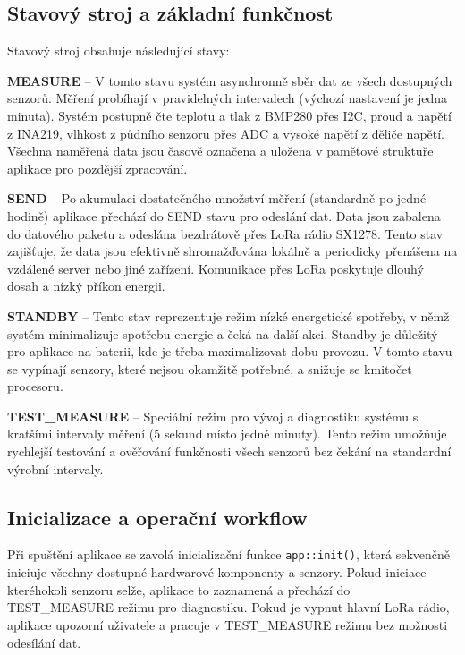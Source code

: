 \documentclass[12pt,a4paper]{article}
\begin{document}
\subsection*{Stavový stroj a základní funkčnost}

Stavový stroj obsahuje následující stavy:

\textbf{MEASURE} -- V tomto stavu systém asynchronně sběr dat ze všech dostupných senzorů. Měření probíhají v pravidelných intervalech (výchozí nastavení je jedna minuta). Systém postupně čte teplotu a tlak z BMP280 přes I2C, proud a napětí z INA219, vlhkost z půdního senzoru přes ADC a vysoké napětí z děliče napětí. Všechna naměřená data jsou časově označena a uložena v paměťové struktuře aplikace pro pozdější zpracování.

\textbf{SEND} -- Po akumulaci dostatečného množství měření (standardně po jedné hodině) aplikace přechází do SEND stavu pro odeslání dat. Data jsou zabalena do datového paketu a odeslána bezdrátově přes LoRa rádio SX1278. Tento stav zajišťuje, že data jsou efektivně shromažďována lokálně a periodicky přenášena na vzdálené server nebo jiné zařízení. Komunikace přes LoRa poskytuje dlouhý dosah a nízký příkon energii.

\textbf{STANDBY} -- Tento stav reprezentuje režim nízké energetické spotřeby, v němž systém minimalizuje spotřebu energie a čeká na další akci. Standby je důležitý pro aplikace na baterii, kde je třeba maximalizovat dobu provozu. V tomto stavu se vypínají senzory, které nejsou okamžitě potřebné, a snižuje se kmitočet procesoru.

\textbf{TEST\_MEASURE} -- Speciální režim pro vývoj a diagnostiku systému s kratšími intervaly měření (5 sekund místo jedné minuty). Tento režim umožňuje rychlejší testování a ověřování funkčnosti všech senzorů bez čekání na standardní výrobní intervaly.

\subsection*{Inicializace a operační workflow}

Při spuštění aplikace se zavolá inicializační funkce \texttt{app::init()}, která sekvenčně iniciuje všechny dostupné hardwarové komponenty a senzory. Pokud iniciace kteréhokoli senzoru selže, aplikace to zaznamená a přechází do TEST\_MEASURE režimu pro diagnostiku. Pokud je vypnut hlavní LoRa rádio, aplikace upozorní uživatele a pracuje v TEST\_MEASURE režimu bez možnosti odesílání dat.
\end{document}
